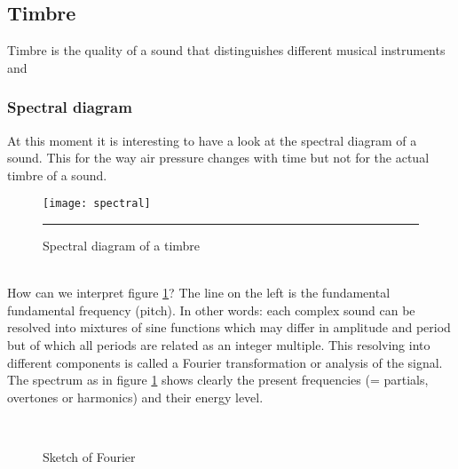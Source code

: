 \subsection{Timbre}
Timbre is the quality of a sound that distinguishes different musical instruments and 

\subsubsection{Spectral diagram}
At this moment it is interesting to have a look at the spectral diagram of a sound. This  for the way air pressure changes with time but not for the actual timbre of a sound.
\begin{figure}[htbp]
\centering
\texttt{[image: spectral]}
\rule{30em}{0.5pt}
\caption{Spectral diagram of a timbre}
\label{fig:spectral}
\end{figure} \\
How can we interpret figure \ref{fig:spectral}? The line on the left is the fundamental  fundamental frequency (pitch). In other words: each complex sound can be resolved into mixtures of sine functions which may differ in amplitude and period but of which all periods are related as an integer multiple. This resolving into different components is called a Fourier transformation or analysis of the signal. \\ The spectrum as in figure \ref{fig:spectral} shows clearly the present frequencies (= partials, overtones or harmonics) and their energy level.
\begin{figure}[htbp]
   \centerline{\hbox{
   \epsfxsize=1.2in
     }
  }
  \caption{Sketch of Fourier}
  \label{fig:fourier}
\end{figure}

